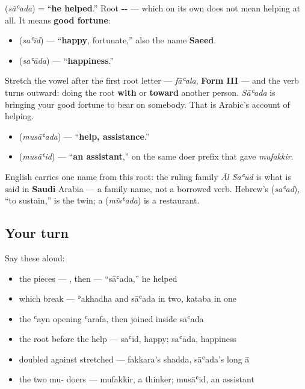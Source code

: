 \begin{cousinweb}
\textbf{} (\emph{sāʿada}) = \textquotedblleft{}\textbf{he helped}.\textquotedblright{} Root \textbf{--} — which on its own does not mean helping at all. It means \textbf{good fortune}:

\begin{itemize}
\raggedright
  \item \textbf{} (\emph{saʿīd}) — \textquotedblleft{}\textbf{happy}, fortunate,\textquotedblright{} also the name \textbf{Saeed}.
  \item \textbf{} (\emph{saʿāda}) — \textquotedblleft{}\textbf{happiness}.\textquotedblright{}
\end{itemize}

Stretch the vowel after the first root letter — \emph{fāʿala}, \textbf{Form III} — and the verb turns outward: doing the root \textbf{with} or \textbf{toward} another person. \emph{Sāʿada} is bringing your good fortune to bear on somebody. That is Arabic's account of helping.

\begin{itemize}
\raggedright
  \item \textbf{} (\emph{musāʿada}) — \textquotedblleft{}\textbf{help, assistance}.\textquotedblright{}
  \item \textbf{} (\emph{musāʿid}) — \textquotedblleft{}\textbf{an assistant},\textquotedblright{} on the same \textbf{} doer prefix that gave \emph{mufakkir}.
\end{itemize}

English carries one name from this root: the ruling family \emph{Āl Saʿūd} is what is said in \textbf{Saudi} Arabia — a family name, not a borrowed verb. Hebrew's \textbf{} (\emph{saʿad}), \textquotedblleft{}to sustain,\textquotedblright{} is the twin; a \textbf{} (\emph{misʿada}) is a restaurant.
\end{cousinweb}

\subsection*{Your turn}
Say these aloud:

\begin{itemize}
\raggedright
  \item the pieces — , then  — \textquotedblleft{}sāʿada,\textquotedblright{} he helped
  \item which break — ʾakhadha and sāʿada in two, kataba in one
  \item the ʿayn opening ʿarafa, then joined inside sāʿada
  \item the root before the help — saʿīd, happy; saʿāda, happiness
  \item doubled against stretched — fakkara's shadda, sāʿada's long ā
  \item the two mu- doers — mufakkir, a thinker; musāʿid, an assistant
\end{itemize}

